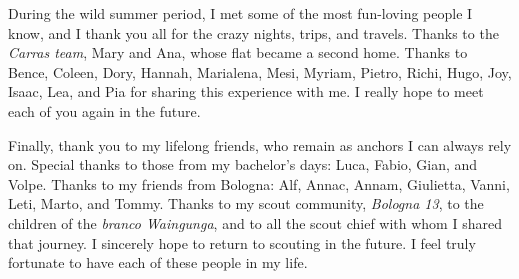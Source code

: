 During the wild summer period, I met some of the most fun-loving people I 
know, and I thank you all for the crazy nights, trips, and travels. Thanks 
to the \emph{Carras team}, Mary and Ana, whose flat became a second home. Thanks 
to Bence, Coleen, Dory, Hannah, Marialena, Mesi, Myriam, Pietro, Richi, 
Hugo, Joy, Isaac, Lea, and Pia for sharing this experience with me. I really 
hope to meet each of you again in the future.

Finally, thank you to my lifelong friends, who remain as anchors I can always 
rely on. Special thanks to those from my bachelor’s days: Luca, Fabio, Gian, 
and Volpe. Thanks to my friends from Bologna: Alf, Annac, Annam, Giulietta, 
Vanni, Leti, Marto, and Tommy. Thanks to my scout community, 
\emph{Bologna 13}, to the children of the \emph{branco Waingunga}, 
and to all the scout chief with 
whom I shared that journey. I sincerely hope to return to scouting in the 
future. I feel truly fortunate to have each of these people in my life.
